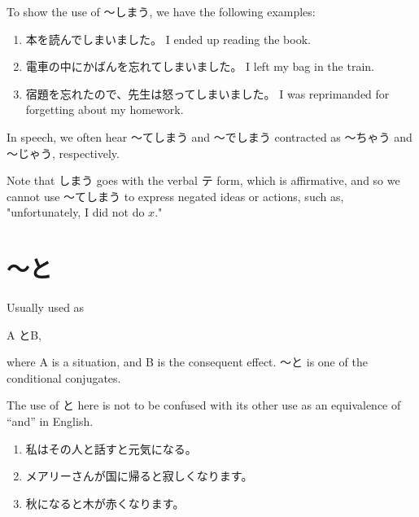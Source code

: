 \documentclass[notoc,notitlepage]{tufte-book}
\begin{document}
\begin{eg}
  To show the use of 〜しまう, we have the following examples:
  \begin{enumerate}
    \item 本を読んでしまいました。 I ended up reading the book.
    \item 電車の中にかばんを忘れてしまいました。 I left my bag in the train.
    \item 宿題を忘れたので、先生は怒ってしまいました。 I was reprimanded
      for forgetting about my homework.
  \end{enumerate}
\end{eg}

\begin{note}
  In speech, we often hear 〜てしまう and 〜でしまう contracted as
  〜ちゃう and 〜じゃう, respectively.
\end{note}

\begin{warning}
  Note that しまう goes with the verbal テ form,
  which is affirmative, and so we cannot use 〜てしまう
  to express negated ideas or actions, such as, "unfortunately,
  I did not do $x$."
\end{warning}


\section{〜と}%
\label{sec:_to}

\begin{defn}[〜と]\label{defn:to}
  Usually used as
  \begin{center}
    A とB,
  \end{center}
  where A is a situation, and B is the consequent effect.
  〜と is one of the conditional conjugates.
\end{defn}

\begin{note}
  The use of と here is not to be confused with its other use as an equivalence
  of ``and'' in English.
\end{note}

\begin{eg}
  \begin{enumerate}
    \item 私はその人と話すと元気になる。
    \item メアリーさんが国に帰ると寂しくなります。
    \item 秋になると木が赤くなります。
  \end{enumerate}
\end{eg}
\end{document}
